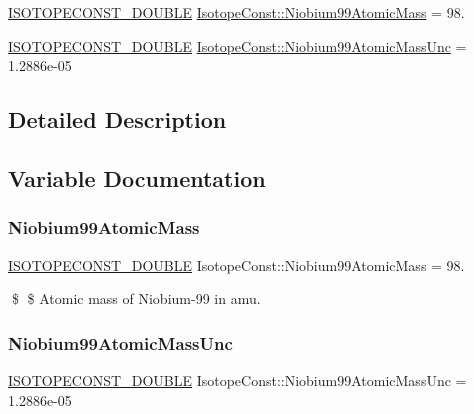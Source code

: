 \begin{DoxyCompactItemize}
\item 
\mbox{\hyperlink{group___isotope_const-_macros_ga8f45a7272ce02c0b4c65c44636ed719a}{I\+S\+O\+T\+O\+P\+E\+C\+O\+N\+S\+T\+\_\+\+D\+O\+U\+B\+LE}} \mbox{\hyperlink{group___isotope_const-_niobium-_nb99_ga092b52e76363120f746454c25d9e4f2a}{Isotope\+Const\+::\+Niobium99\+Atomic\+Mass}} = 98.
\item 
\mbox{\hyperlink{group___isotope_const-_macros_ga8f45a7272ce02c0b4c65c44636ed719a}{I\+S\+O\+T\+O\+P\+E\+C\+O\+N\+S\+T\+\_\+\+D\+O\+U\+B\+LE}} \mbox{\hyperlink{group___isotope_const-_niobium-_nb99_ga10996b2cea4f5b40005c977dfa358f0a}{Isotope\+Const\+::\+Niobium99\+Atomic\+Mass\+Unc}} = 1.\+2886e-\/05
\end{DoxyCompactItemize}


\subsection{Detailed Description}


\subsection{Variable Documentation}
\mbox{\label{group___isotope_const-_niobium-_nb99_ga092b52e76363120f746454c25d9e4f2a}} 
\subsubsection{\texorpdfstring{Niobium99\+Atomic\+Mass}{Niobium99AtomicMass}}
{\footnotesize\ttfamily \mbox{\hyperlink{group___isotope_const-_macros_ga8f45a7272ce02c0b4c65c44636ed719a}{I\+S\+O\+T\+O\+P\+E\+C\+O\+N\+S\+T\+\_\+\+D\+O\+U\+B\+LE}} Isotope\+Const\+::\+Niobium99\+Atomic\+Mass = 98.}

\$ \$ Atomic mass of Niobium-\/99 in amu. \mbox{\label{group___isotope_const-_niobium-_nb99_ga10996b2cea4f5b40005c977dfa358f0a}} 
\subsubsection{\texorpdfstring{Niobium99\+Atomic\+Mass\+Unc}{Niobium99AtomicMassUnc}}
{\footnotesize\ttfamily \mbox{\hyperlink{group___isotope_const-_macros_ga8f45a7272ce02c0b4c65c44636ed719a}{I\+S\+O\+T\+O\+P\+E\+C\+O\+N\+S\+T\+\_\+\+D\+O\+U\+B\+LE}} Isotope\+Const\+::\+Niobium99\+Atomic\+Mass\+Unc = 1.\+2886e-\/05}

